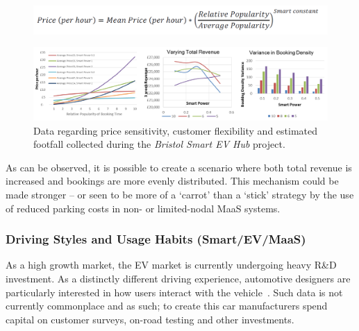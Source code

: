 \documentclass[journal]{IEEEtran}
\begin{document}
\begin{figure}[!h]
\centering
\includegraphics[width=\columnwidth]{images/smartpricingformula.png}
\label{fig:smartpricingformula}
\end{figure}

\begin{figure}[!htb]
\centering
\includegraphics[width=\textwidth]{images/smartpricegraphs.png}
\caption{Data regarding price sensitivity, customer flexibility and
estimated footfall collected during the {\emph{Bristol Smart EV Hub}} project.}
\label{fig:smartpricegraphs}
\end{figure}


As can be observed, it is possible to create a scenario where both
total revenue is increased and bookings are more evenly
distributed. This mechanism could be made stronger -- or seen to be
more of a `carrot' than a `stick' strategy by the use of reduced
parking costs in non- or limited-nodal MaaS systems.

\subsubsection{Driving Styles and Usage Habits (Smart/EV/MaaS)} 

As a high growth market, the EV market is currently undergoing heavy
R\&D investment. As a distinctly different driving experience,
automotive designers are particularly interested in how users interact
with the vehicle~\cite{ferreira-et-al:2013}. Such data is not
currently commonplace and as such; to create this car manufacturers
spend capital on customer surveys, on-road testing and other
investments.
\end{document}
